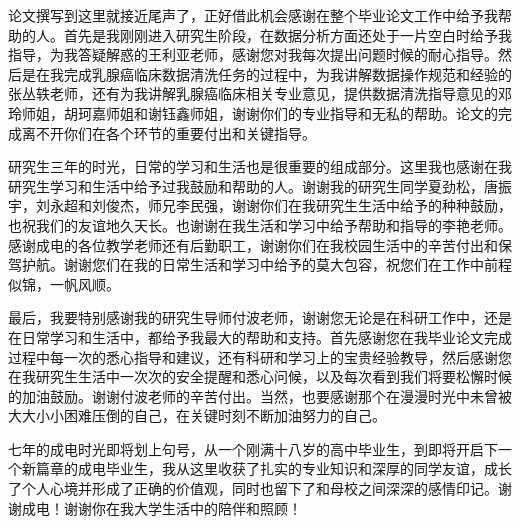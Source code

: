 
\thesisacknowledgement
论文撰写到这里就接近尾声了，正好借此机会感谢在整个毕业论文工作中给予我帮助的人。首先是我刚刚进入研究生阶段，在数据分析方面还处于一片空白时给予我指导，为我答疑解惑的王利亚老师，感谢您对我每次提出问题时候的耐心指导。然后是在我完成乳腺癌临床数据清洗任务的过程中，为我讲解数据操作规范和经验的张丛轶老师，还有为我讲解乳腺癌临床相关专业意见，提供数据清洗指导意见的邓玲师姐，胡珂嘉师姐和谢钰鑫师姐，谢谢你们的专业指导和无私的帮助。论文的完成离不开你们在各个环节的重要付出和关键指导。

研究生三年的时光，日常的学习和生活也是很重要的组成部分。这里我也感谢在我研究生学习和生活中给予过我鼓励和帮助的人。谢谢我的研究生同学夏劲松，唐振宇，刘永超和刘俊杰，师兄李民强，谢谢你们在我研究生生活中给予的种种鼓励，也祝我们的友谊地久天长。也谢谢在我生活和学习中给予帮助和指导的李艳老师。感谢成电的各位教学老师还有后勤职工，谢谢你们在我校园生活中的辛苦付出和保驾护航。谢谢您们在我的日常生活和学习中给予的莫大包容，祝您们在工作中前程似锦，一帆风顺。

最后，我要特别感谢我的研究生导师付波老师，谢谢您无论是在科研工作中，还是在日常学习和生活中，都给予我最大的帮助和支持。首先感谢您在我毕业论文完成过程中每一次的悉心指导和建议，还有科研和学习上的宝贵经验教导，然后感谢您在我研究生生活中一次次的安全提醒和悉心问候，以及每次看到我们将要松懈时候的加油鼓励。谢谢付波老师的辛苦付出。当然，也要感谢那个在漫漫时光中未曾被大大小小困难压倒的自己，在关键时刻不断加油努力的自己。

七年的成电时光即将划上句号，从一个刚满十八岁的高中毕业生，到即将开启下一个新篇章的成电毕业生，我从这里收获了扎实的专业知识和深厚的同学友谊，成长了个人心境并形成了正确的价值观，同时也留下了和母校之间深深的感情印记。谢谢成电！谢谢你在我大学生活中的陪伴和照顾！

